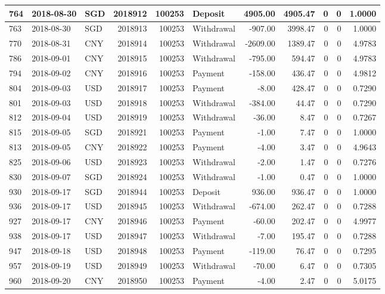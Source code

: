 \documentclass[]{article}
\begin{document}
\begin{table}[H]
\begin{tabular}{l|l|l|r|r|l|r|r|r|r|r}
\hline
764 & 2018-08-30 & SGD & 2018912 & 100253 & Deposit & 4905.00 & 4905.47 & 0 & 0 & 1.0000\\
\hline
763 & 2018-08-30 & SGD & 2018913 & 100253 & Withdrawal & -907.00 & 3998.47 & 0 & 0 & 1.0000\\
\hline
770 & 2018-08-31 & CNY & 2018914 & 100253 & Withdrawal & -2609.00 & 1389.47 & 0 & 0 & 4.9783\\
\hline
786 & 2018-09-01 & CNY & 2018915 & 100253 & Withdrawal & -795.00 & 594.47 & 0 & 0 & 4.9783\\
\hline
794 & 2018-09-02 & CNY & 2018916 & 100253 & Payment & -158.00 & 436.47 & 0 & 0 & 4.9812\\
\hline
804 & 2018-09-03 & USD & 2018917 & 100253 & Payment & -8.00 & 428.47 & 0 & 0 & 0.7290\\
\hline
801 & 2018-09-03 & USD & 2018918 & 100253 & Withdrawal & -384.00 & 44.47 & 0 & 0 & 0.7290\\
\hline
812 & 2018-09-04 & USD & 2018919 & 100253 & Withdrawal & -36.00 & 8.47 & 0 & 0 & 0.7267\\
\hline
815 & 2018-09-05 & SGD & 2018921 & 100253 & Payment & -1.00 & 7.47 & 0 & 0 & 1.0000\\
\hline
813 & 2018-09-05 & CNY & 2018922 & 100253 & Payment & -4.00 & 3.47 & 0 & 0 & 4.9643\\
\hline
825 & 2018-09-06 & USD & 2018923 & 100253 & Withdrawal & -2.00 & 1.47 & 0 & 0 & 0.7276\\
\hline
830 & 2018-09-07 & SGD & 2018924 & 100253 & Withdrawal & -1.00 & 0.47 & 0 & 0 & 1.0000\\
\hline
930 & 2018-09-17 & SGD & 2018944 & 100253 & Deposit & 936.00 & 936.47 & 0 & 0 & 1.0000\\
\hline
936 & 2018-09-17 & USD & 2018945 & 100253 & Withdrawal & -674.00 & 262.47 & 0 & 0 & 0.7288\\
\hline
927 & 2018-09-17 & CNY & 2018946 & 100253 & Payment & -60.00 & 202.47 & 0 & 0 & 4.9977\\
\hline
938 & 2018-09-17 & USD & 2018947 & 100253 & Withdrawal & -7.00 & 195.47 & 0 & 0 & 0.7288\\
\hline
947 & 2018-09-18 & USD & 2018948 & 100253 & Payment & -119.00 & 76.47 & 0 & 0 & 0.7295\\
\hline
957 & 2018-09-19 & USD & 2018949 & 100253 & Withdrawal & -70.00 & 6.47 & 0 & 0 & 0.7305\\
\hline
960 & 2018-09-20 & CNY & 2018950 & 100253 & Payment & -4.00 & 2.47 & 0 & 0 & 5.0175\\

\end{tabular}
\end{table}
\end{document}
